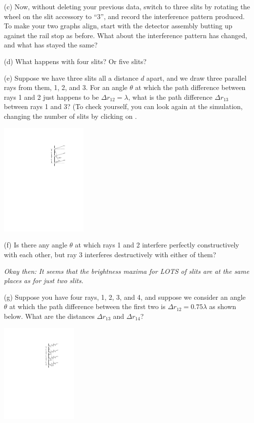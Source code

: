 (c) Now, without deleting your previous data, switch to three slits by rotating the wheel on the slit accessory 
to ``3'', and record the interference pattern produced.
To make your two graphs align, start with the detector assembly butting up against the rail stop as before.  
What about the interference pattern has changed, and what has stayed the same?
\answerspace{0.8in}

(d) What happens with four slits?  Or five slits?
\answerspace{0.8in}

(e) Suppose we have three slits all a distance $d$ apart, and we draw three parallel rays from them, 1, 2, and 3.  For an angle $\theta$ at which the path difference between rays 1 and 2 just happens to be $\Delta r_{12} = \lambda$, what is the path difference $\Delta r_{13}$ between rays 1 and 3?  (To check yourself, you can look again at the simulation, changing the number of slits by clicking on .

\hspace{0.5in}\includegraphics[width=1.7in]{interference_of_light/three_slits.pdf}

(f) Is there any angle $\theta$ at which rays 1 and 2 interfere perfectly constructively with each other,  but ray 3 interferes destructively with either of them?
\answerspace{0.3in}

\textit{Okay then: It seems that the brightness maxima for LOTS of slits are at the same places as for just two slits.}

\pagebreak[2]
(g) Suppose you have four rays, 1, 2, 3, and 4, and suppose we consider an angle $\theta$ at which the path difference between the first two is $\Delta r_{12} = 0.75\lambda$ as shown below.  What are the distances $\Delta r_{13}$ and $\Delta r_{14}$?

\hspace{0.5in}\includegraphics[width=1.5in]{interference_of_light/four_slits.pdf}

